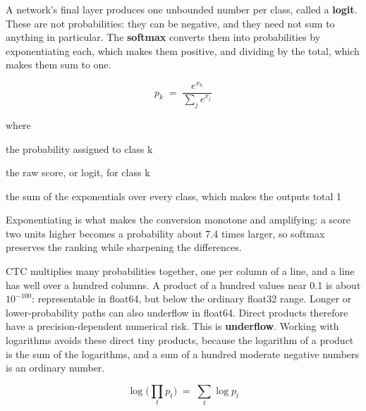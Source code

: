 A network's final layer produces one unbounded number per class, called a \textbf{logit}. These are not probabilities: they can be negative, and they need not sum to anything in particular. The \textbf{softmax} converts them into probabilities by exponentiating each, which makes them positive, and dividing by the total, which makes them sum to one.


\begin{equation}
p_{k} \;=\; \frac{e^{x_{k}}}{\sum_{j} e^{x_{j}}}
\end{equation}

\noindent where
\begin{description}[leftmargin=2.4em,style=nextline,font=\normalfont\ttfamily]\setlength\itemsep{1pt}
  \item[{$p_k$}] \normalfont the probability assigned to class k
  \item[{$x_k$}] \normalfont the raw score, or logit, for class k
  \item[{$\sum_{j} e^{x_{j}}$}] \normalfont the sum of the exponentials over every class, which makes the outputs total 1
\end{description}
Exponentiating is what makes the conversion monotone and amplifying: a score two units higher becomes a probability about 7.4 times larger, so softmax preserves the ranking while sharpening the differences.


CTC multiplies many probabilities together, one per column of a line, and a line has well over a hundred columns. A product of a hundred values near 0.1 is about $10^{-100}$: representable in float64, but below the ordinary float32 range. Longer or lower-probability paths can also underflow in float64. Direct products therefore have a precision-dependent numerical risk. This is \textbf{underflow}. Working with logarithms avoids these direct tiny products, because the logarithm of a product is the sum of the logarithms, and a sum of a hundred moderate negative numbers is an ordinary number.


\begin{equation}
\log\!\Big(\prod_{t} p_{t}\Big) \;=\; \sum_{t} \log p_{t}
\end{equation}


